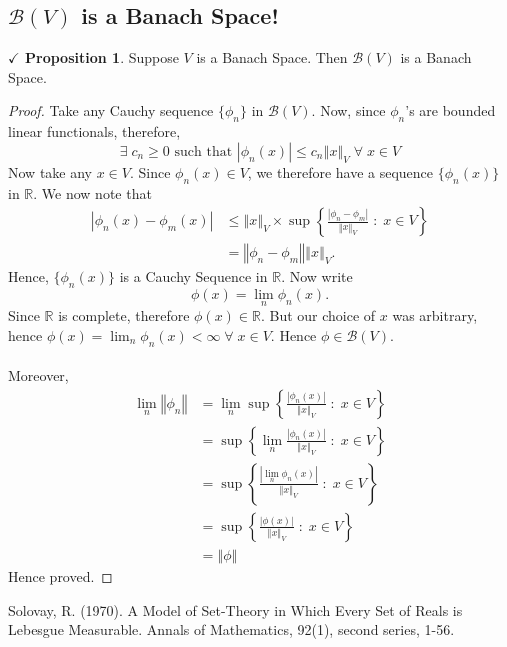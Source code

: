 \documentclass{article}
\theoremstyle{definition}
\theoremstyle{remark}
\theoremstyle{definition}
\theoremstyle{definition}
\newtheorem{proposition}{$\checkmark$ Proposition}
\theoremstyle{definition}
\newcommand{\abs}[1]{\left \vert #1\right \vert}
\newcommand{\norm}[1]{\left \Vert #1 \right \Vert}
\newcommand{\R}{\mathbb{R}}
\newcommand{\alg}[1]{\mathscr{#1}}
\newcommand{\sblf}[1]{\alg{B}\left (#1\right )} %
\begin{document}
\subsection{$ \sblf{V} $ is a Banach Space!}
\begin{proposition}
	Suppose $ V $ is a Banach Space. Then $ \sblf{V} $ is a Banach Space.
\end{proposition}
\begin{proof}
	Take any Cauchy sequence $ \{\phi_n\} $ in $ \sblf{V} $. Now, since $ \phi_n $'s are bounded linear functionals, therefore,
	\[\exists\; c_n\ge 0 \text{ such that }\abs{\phi_n(x)} \le c_n \norm{x}_V\;\forall\;x\in V \]
	Now take any $ x\in V $. Since $ \phi_n(x) \in V$, we therefore have a sequence $ \{\phi_n(x)\} $ in $ \R $. We now note that
	\begin{align*}
		\abs{\phi_n(x) - \phi_m(x)} &\le \norm{x}_V\times \sup\left \{\frac{\abs{\phi_n - \phi_m}}{\norm{x}_V}\;:\;x\in V\right \}\\
		&= \norm{\phi_n - \phi_m} \norm{x}_V.
	\end{align*}
	Hence, $ \{\phi_n(x)\} $ is a Cauchy Sequence in $ \R $. Now write 
	\[\phi(x) = \lim_{n} \phi_n(x).\]
	Since $ \R $ is complete, therefore $ \phi(x) \in \R$. But our choice of $ x $ was arbitrary, hence $ \phi(x) = \lim_{n}\phi_n(x) < \infty\;\forall\;x\in V$. Hence $ \phi \in \sblf{V} $. \\\\
	Moreover,
	\begin{align*}
		\lim_n\norm{\phi_n} &=  \lim_n\sup\left \{\frac{\abs{\phi_n(x)}}{\norm{x}_V}\;:\; x\in V\right \}\\
		&= \sup\left \{\lim_n\frac{\abs{\phi_n(x)}}{\norm{x}_V}\;:\; x\in V\right \}\\
		&= \sup\left \{\frac{\abs{\lim_n \phi_n(x)}}{\norm{x}_V}\;:\; x\in V\right \}\\
		&= \sup\left \{\frac{\abs{\phi(x)}}{\norm{x}_V}\;:\; x\in V\right \}\\
		&= \norm{\phi}
	\end{align*}
Hence proved.
 \end{proof}
\hrulefill
\newpage
\begin{thebibliography}{9}
	Solovay, R. (1970). A Model of Set-Theory in Which Every Set of Reals is Lebesgue Measurable. Annals of Mathematics, 92(1), second series, 1-56.
\end{thebibliography}
\end{document}
